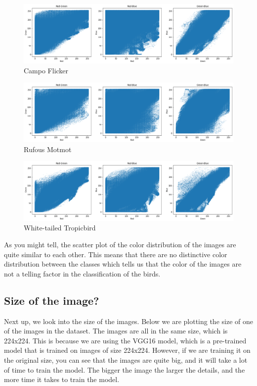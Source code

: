\begin{figure}[h]
\centering
\includegraphics[scale=0.38]{campo-flicker-corr.png}
\caption{Campo Flicker}
\end{figure}

\begin{figure}[h]
\centering
\includegraphics[scale=0.38]{rufuos-motmot-corr.png}
\caption{Rufous Motmot}
\end{figure}

\begin{figure}[h]
\centering
\includegraphics[scale=0.38]{white-tailed-tropic-corr.png}
\caption{White-tailed Tropicbird}
\end{figure}

As you might tell, the scatter plot of the color distribution of the images are quite similar to each other. This means that there are no distinctive color distribution between the classes which tells us that the color of the images are not a telling factor in the classification of the birds.

\pagebreak
\subsection{Size of the image?}
Next up, we look into the size of the images. Below we are plotting the size of one of the images in the dataset. The images are all in the same size, which is 224x224. This is because we are using the VGG16 model, which is a pre-trained model that is trained on images of size 224x224. However, if we are training it on the original size, you can see that the images are quite big, and it will take a lot of time to train the model. The bigger the image the larger the details, and the more time it takes to train the model. 

